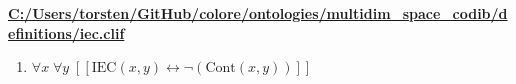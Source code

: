 \documentclass{article}
\begin{document}
\textbf{\url{C:/Users/torsten/GitHub/colore/ontologies/multidim\_space\_codib/definitions/iec.clif}}

\begin{enumerate}
\item $\forall x\; \forall y\;  \left[ \left[ \textrm{IEC}(x,y) \leftrightarrow \neg \left(\textrm{Cont}(x,y)\right) \right] \right]$
\end{enumerate}
\end{document}

